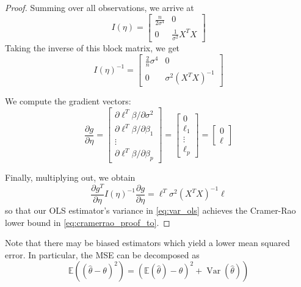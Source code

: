 \documentclass[11pt, %
	oneside, %
	english, %
	onehalfspacing, %
	]{article} %
\numberwithin{equation}{section}
\begin{document}
\begin{proof}
    Summing over all observations, we arrive at
    $$
    I(\eta) =
    \begin{bmatrix}
    \frac{n}{2 \sigma^4} & 0  \\
    0 & \frac{1}{\sigma^2} X^TX
    \end{bmatrix}
    $$
    Taking the inverse of this block matrix, we get
    $$
    I(\eta)^{-1} =
    \begin{bmatrix}
    \frac{2}{n} \sigma^4 & 0  \\
    0& \sigma^2 (X^TX)^{-1}
    \end{bmatrix}
    $$

    We compute the gradient vectors:
    \begin{equation*}
        \frac{\partial g}{\partial \eta}
        =
        \begin{bmatrix}
            \partial \ell^T \beta / \partial \sigma^2 \\
            \partial \ell^T \beta / \partial \beta_1 \\
            \vdots \\
            \partial \ell^T \beta / \partial \beta_p
        \end{bmatrix}
        =
        \begin{bmatrix}
            0 \\
            \ell_1 \\
            \vdots \\
            \ell_p
        \end{bmatrix}
        =
        \begin{bmatrix}
            0 \\
            \ell
        \end{bmatrix}
    \end{equation*}


    Finally, multiplying out, we obtain
    $$
    \frac{\partial g^T}{\partial \eta} I(\eta)^{-1}  \frac{\partial g}{\partial \eta} = \ell^T \sigma^2 \left( X^T X \right)^{-1} \ell
    $$
    so that our OLS estimator's variance in \eqref{eq:var_ols} achieves the Cramer-Rao lower bound in \eqref{eq:cramerrao_proof_to}.
\end{proof}

Note that there may be biased estimators which yield a lower mean squared error. In particular, the MSE can be decomposed as
\begin{equation}\label{eq:mse_bias_var}
    \left.\mathbb{E}\left((\hat{\theta}-\theta)^2\right)=(\mathbb{E}(\hat{\theta})-\theta)^2+\operatorname{Var}(\hat{\theta})\right)
\end{equation}
\end{document}

